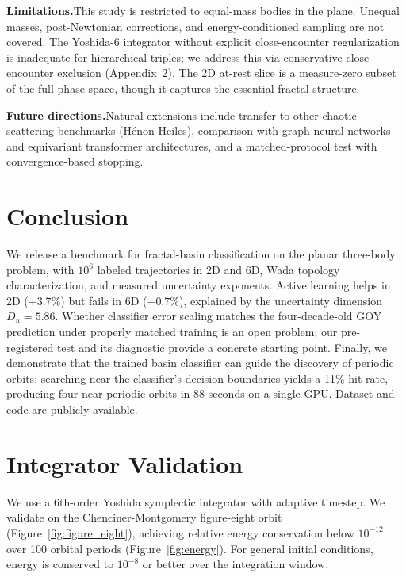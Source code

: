 \documentclass[10pt]{article}
\begin{document}
\textbf{Limitations.}\quad This study is restricted to equal-mass bodies in the plane. Unequal masses, post-Newtonian corrections, and energy-conditioned sampling are not covered. The Yoshida-6 integrator without explicit close-encounter regularization is inadequate for hierarchical triples; we address this via conservative close-encounter exclusion (Appendix~\ref{app:integrator}). The 2D at-rest slice is a measure-zero subset of the full phase space, though it captures the essential fractal structure.

\textbf{Future directions.}\quad Natural extensions include transfer to other chaotic-scattering benchmarks (H\'enon-Heiles), comparison with graph neural networks and equivariant transformer architectures, and a matched-protocol test with convergence-based stopping.

\section{Conclusion}

We release a benchmark for fractal-basin classification on the planar three-body problem, with $10^6$ labeled trajectories in 2D and 6D, Wada topology characterization, and measured uncertainty exponents. Active learning helps in 2D ($+3.7\%$) but fails in 6D ($-0.7\%$), explained by the uncertainty dimension $D_u = 5.86$. Whether classifier error scaling matches the four-decade-old GOY prediction under properly matched training is an open problem; our pre-registered test and its diagnostic provide a concrete starting point. Finally, we demonstrate that the trained basin classifier can guide the discovery of periodic orbits: searching near the classifier's decision boundaries yields a 11\% hit rate, producing four near-periodic orbits in 88 seconds on a single GPU. Dataset and code are publicly available.




\clearpage
\appendix

\section{Integrator Validation}\label{app:integrator}

We use a 6th-order Yoshida symplectic integrator \citep{Yoshida1990} with adaptive timestep. We validate on the Chenciner-Montgomery figure-eight orbit \citep{ChencinerMontgomery2000} (Figure~\ref{fig:figure_eight}), achieving relative energy conservation below $10^{-12}$ over 100 orbital periods (Figure~\ref{fig:energy}). For general initial conditions, energy is conserved to $10^{-8}$ or better over the integration window.
\end{document}

